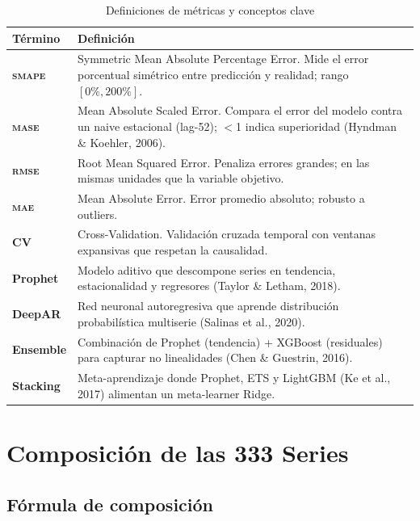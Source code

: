 \documentclass[12pt, letterpaper]{article}
\newcommand{\smape}{\textnormal{\textsc{smape}}}
\newcommand{\mase}{\textnormal{\textsc{mase}}}
\newcommand{\rmse}{\textnormal{\textsc{rmse}}}
\newcommand{\mae}{\textnormal{\textsc{mae}}}
\begin{document}
\begin{table}[H]
\centering
\caption{Definiciones de métricas y conceptos clave}
\label{tab:definiciones}
\small
\begin{tabularx}{\textwidth}{>{\bfseries}l X}
\toprule
\textbf{Término} & \textbf{Definición} \\
\midrule
\smape{} & Symmetric Mean Absolute Percentage Error. Mide el error porcentual simétrico entre predicción y realidad; rango $[0\%, 200\%]$. \\
\mase{} & Mean Absolute Scaled Error. Compara el error del modelo contra un naive estacional (lag-52); $<$1 indica superioridad (Hyndman \& Koehler, 2006). \\
\rmse{} & Root Mean Squared Error. Penaliza errores grandes; en las mismas unidades que la variable objetivo. \\
\mae{} & Mean Absolute Error. Error promedio absoluto; robusto a outliers. \\
CV & Cross-Validation. Validación cruzada temporal con ventanas expansivas que respetan la causalidad. \\
Prophet & Modelo aditivo que descompone series en tendencia, estacionalidad y regresores (Taylor \& Letham, 2018). \\
DeepAR & Red neuronal autoregresiva que aprende distribución probabilística multiserie (Salinas et al., 2020). \\
Ensemble & Combinación de Prophet (tendencia) + XGBoost (residuales) para capturar no linealidades (Chen \& Guestrin, 2016). \\
Stacking & Meta-aprendizaje donde Prophet, ETS y LightGBM (Ke et al., 2017) alimentan un meta-learner Ridge. \\
\bottomrule
\end{tabularx}
\end{table}

\newpage
\section{Composición de las 333 Series}\label{sec:composicion}

\subsection{Fórmula de composición}
\end{document}
